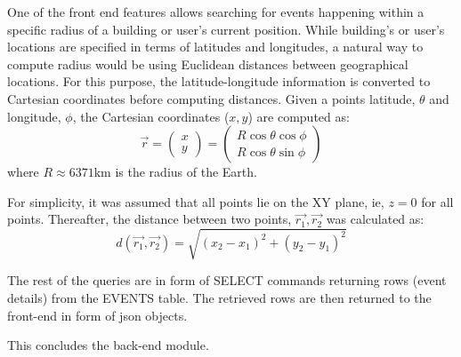 \documentclass{acm_proc_article-sp}
\begin{document}
One of the front end features allows searching for events happening within a specific radius of a building or user's current position. While building's or user's locations are specified in terms of latitudes and longitudes, a natural way to compute radius would be using Euclidean distances between geographical locations. For this purpose, the latitude-longitude information is converted to Cartesian coordinates before computing distances. Given  a points latitude, $\theta$ and longitude, $\phi$, the Cartesian coordinates ($x,y$) are computed as:\\
\begin{equation}
\vec{r}=\left(\begin{array}{c}x\\y\end{array}\right)
=
\left(\begin{array}{c}
R\cos\theta\cos\phi
\\
R\cos\theta\sin\phi
\end{array}\right)
\end{equation}
where $R\approx 6371 \mathrm{km}$ is the radius of the Earth. 

For simplicity, it was assumed that all points lie on the XY plane, ie, $z=0$ for all points. Thereafter, the distance between two points, $\vec{r_1},\vec{r_2}$ was calculated as:
\begin{equation}
d(\vec{r_1},\vec{r_2})=\sqrt{(x_2-x_1)^2+(y_2-y_1)^2}
\end{equation}

The rest of the queries are in form of SELECT commands returning rows (event details) from the EVENTS table. The retrieved rows are then returned to the front-end in form of json objects. 

This concludes the back-end module.
\end{document}
